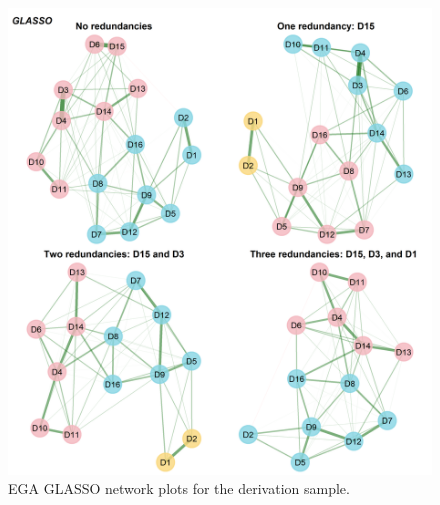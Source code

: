 \documentclass[
  12pt,
  twoside,
  openright,
  a4paper,
  chapter=TITLE,
  section=TITLE,
  brazil]{abntex2}
\begin{document}
\begin{figure}

{\centering \includegraphics{img/glasso-plots-1.png}

}

\caption{\label{fig-glasso-plots}EGA GLASSO network plots for the
derivation sample.}

\end{figure}
\end{document}
